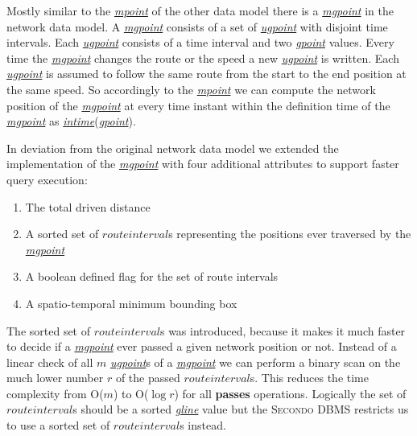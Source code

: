\documentclass[a4paper]{article}
\newcommand{\secondo}{\textsc{Secondo}}
\newcommand{\op}[1]{\textbf{#1}}
\newcommand{\dt}[1]{\textsl{\underline{#1}}}
\begin{document}
{Mostly similar to the \dt{mpoint} of the other data model there is a
\dt{mgpoint} in the network data model. A \dt{mgpoint} consists of a set of
\dt{ugpoint} with disjoint time intervals. Each \dt{ugpoint} consists of a time
interval and two \dt{gpoint} values. Every time the \dt{mgpoint} changes the route
or the speed a new \dt{ugpoint} is written. Each \dt{ugpoint} is assumed to follow
the same route from the start to the end position at the same speed. So accordingly
to the \dt{mpoint} we can compute the network position of the \dt{mgpoint} at every
time instant within the definition time of the \dt{mgpoint} as \dt{intime}(\dt{gpoint}).

In deviation from the original network data model we extended the implementation
of the \dt{mgpoint} with four additional attributes to support faster query execution:
\begin{enumerate}
	\item The total driven distance
	\item A sorted set of $route interval$s representing the positions ever
traversed by the \dt{mgpoint}
	\item A boolean defined flag for the set of route intervals
	\item A spatio-temporal minimum bounding box
\end{enumerate}
The sorted set of $route interval$s was introduced, because it makes it much
faster to decide if a \dt{mgpoint} ever passed a given network position or not.
Instead of a linear check of all $m$ \dt{ugpoint}s of a \dt{mgpoint} we can
perform a binary scan on the much lower number $r$ of the passed $route interval$s.
This reduces the time complexity from O($m$) to O($\log r$) for all \op{passes}
operations. Logically the set of $route interval$s should be a sorted \dt{gline}
value but the \secondo{} DBMS restricts us to use a sorted set of $route interval$s
instead.

}
\end{document}

